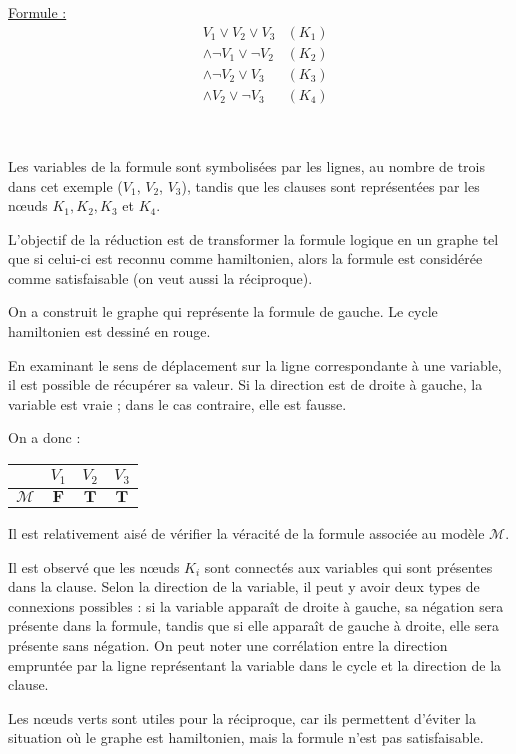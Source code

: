 \documentclass{article}
\begin{document}
    \begin{multicols}{5}

      \underline{Formule :} 
      \begin{align*} 
        & V_1 \vee V_2 \vee V_3          & (K_1) \\
        &\wedge \neg V_1 \vee \neg V_2  & (K_2) \\
        &\wedge \neg V_2 \vee V_3       & (K_3) \\
        &\wedge V_2 \vee \neg V_3       & (K_4) \\ \\ \\ \\ \\ \\
      \end{align*}

      Les variables de la formule sont symbolisées par les lignes, 
      au nombre de trois dans cet exemple ($V_1$, $V_2$, $V_3$),
      tandis que les clauses sont représentées par les n\oe uds $K_1, K_2, K_3$ et $K_4$.

      L'objectif de la réduction est de transformer la formule logique 
      en un graphe tel que si celui-ci est reconnu comme hamiltonien, 
      alors la formule est considérée comme satisfaisable (on veut aussi la réciproque).

      \columnbreak

      On a construit le graphe qui représente la formule de gauche.
      Le cycle hamiltonien est dessiné en rouge.
      
      En examinant le sens de déplacement sur la ligne correspondante 
      à une variable, il est possible de récupérer sa valeur. 
      Si la direction est de droite à gauche, la variable est vraie ; 
      dans le cas contraire, elle est fausse.

      \columnbreak

      On a donc :

      \begin{tabular}{c c c c}
        & $V_1$ & $V_2$ & $V_3$ \\
        \hline
        $\mathcal{M}$ & $\mathbf{F}$ & $\mathbf{T}$ & $\mathbf{T}$
      \end{tabular}

      Il est relativement aisé de vérifier 
      la véracité de la formule associée au modèle $\mathcal{M}$.

      Il est observé que les nœuds $K_i$ sont connectés aux variables 
      qui sont présentes dans la clause. 
      Selon la direction de la variable, il peut y avoir 
      deux types de connexions possibles : si la variable apparaît de droite à gauche, 
      sa négation sera présente dans la formule, tandis que si elle apparaît de gauche à droite, 
      elle sera présente sans négation. 
      On peut noter une corrélation entre la direction empruntée par la ligne représentant 
      la variable dans le cycle et la direction de la clause.

      Les nœuds verts sont utiles pour la réciproque, car ils permettent 
      d'éviter la situation où le graphe est hamiltonien, mais la formule n'est pas satisfaisable.
    \end{multicols}
\end{document}
